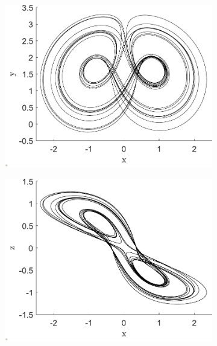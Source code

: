 \begin{figure}[H]
\centering
\begin{subfigure}[ht]{0.3\textwidth}
\includegraphics[scale=0.28]{files/int_adams_xy.pdf}
\end{subfigure}
\begin{subfigure}[ht]{0.3\textwidth}
\includegraphics[scale=0.28]{files/int_adams_xz.pdf}
\end{subfigure}
\begin{subfigure}[ht]{0.3\textwidth}

\end{subfigure}
\end{figure}
